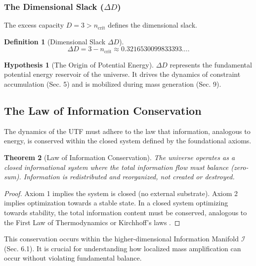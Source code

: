 \documentclass[11pt, a4paper]{article}
\newtheorem{theorem}{Theorem}[section]
\theoremstyle{definition}
\newtheorem{definition}[theorem]{Definition}
\newtheorem{hypothesis}{Hypothesis}
\theoremstyle{definition}
\newcommand{\Ical}{\mathcal{I}}
\newcommand{\ncrit}{n_{\mathrm{crit}}}
\newcommand{\DeltaDval}{0.3216530099833393...}
\begin{document}
\subsubsection{The Dimensional Slack (\texorpdfstring{$\Delta D$}{Delta D})}

The excess capacity $D=3 > \ncrit$ defines the dimensional slack.
\begin{definition}[Dimensional Slack $\Delta D$]
\begin{equation}
    \Delta D = 3 - \ncrit \approx \DeltaDval.
\end{equation}
\end{definition}

\begin{hypothesis}[The Origin of Potential Energy]\label{hyp:PotentialEnergy}
$\Delta D$ represents the fundamental potential energy reservoir of the universe. It drives the dynamics of constraint accumulation (Sec. 5) and is mobilized during mass generation (Sec. 9).
\end{hypothesis}

\subsection{The Law of Information Conservation}
\label{sec:InfoConservation}

The dynamics of the UTF must adhere to the law that information, analogous to energy, is conserved within the closed system defined by the foundational axioms.

\begin{theorem}[Law of Information Conservation]\label{thm:InfoConservation}
The universe operates as a closed informational system where the total information flow must balance (zero-sum). Information is redistributed and reorganized, not created or destroyed.
\end{theorem}
\begin{proof}
Axiom 1 implies the system is closed (no external substrate). Axiom 2 implies optimization towards a stable state. In a closed system optimizing towards stability, the total information content must be conserved, analogous to the First Law of Thermodynamics or Kirchhoff's laws \cite{Kirchhoff1847}.
\end{proof}


This conservation occurs within the higher-dimensional Information Manifold $\Ical$ (Sec. 6.1). It is crucial for understanding how localized mass amplification can occur without violating fundamental balance.
\end{document}
